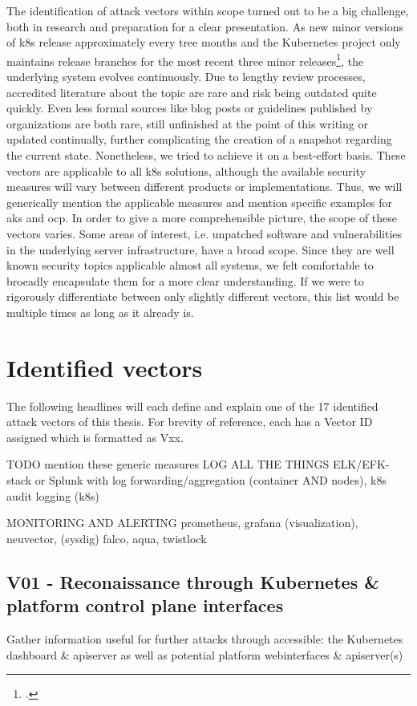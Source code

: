 The identification of attack vectors within scope turned out to be a big challenge, both in research and preparation for a clear presentation. 
As new minor versions of \gls{k8s} release approximately every tree months and the Kubernetes project only maintains release branches for the most recent three minor releases\footcite[][, section 'Supported versions']{k8sSupport}, the underlying system evolves continuously. Due to lengthy review processes, accredited literature about the topic are rare and risk being outdated quite quickly. Even less formal sources like blog posts or guidelines published by organizations are both rare, still unfinished at the point of this writing or updated continually, further complicating the creation of a snapshot regarding the current state. Nonetheless, we tried to achieve it on a best-effort basis.
These vectors are applicable to all \gls{k8s} solutions, although the available security measures will vary between different products or implementations. Thus, we will generically mention the applicable measures and mention specific examples for \gls{aks} and \gls{ocp}.
In order to give a more comprehensible picture, the scope of these vectors varies. Some areas of interest, i.e. unpatched software and vulnerabilities in the underlying server  infrastructure, have a broad scope. Since they are well known security topics applicable almost all systems, we felt comfortable to broeadly encapsulate them for a more clear understanding. If we were to rigorously differentiate between only slightly different vectors, this list would be multiple times as long as it already is.

\section{Identified vectors}
The following headlines will each define and explain one of the 17 identified attack vectors of this thesis. For brevity of reference, each has a Vector ID assigned which is formatted as Vxx.

TODO mention these generic measures
LOG ALL THE THINGS
	ELK/EFK-stack or Splunk with log forwarding/aggregation (container AND nodes), k8s audit logging (k8s)
	
MONITORING AND ALERTING
	prometheus, grafana (visualization), neuvector, (sysdig) falco, aqua, twistlock


\subsection{V01 - Reconaissance through Kubernetes \& platform control plane interfaces}
Gather information useful for further attacks through accessible: the Kubernetes dashboard \& apiserver as well as potential platform webinterfaces \& apiserver(s)

